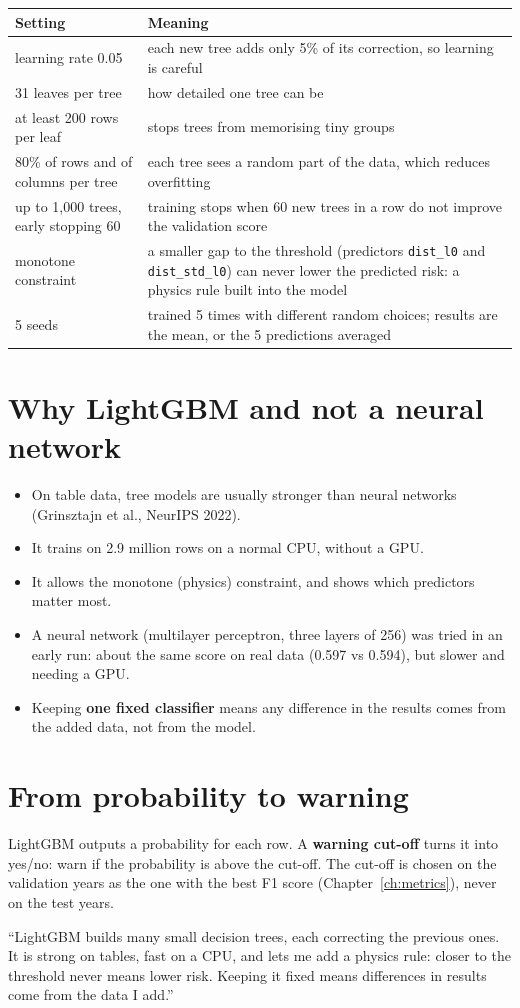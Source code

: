 \begin{center}
\footnotesize
\begin{tabular}{p{4.5cm}p{9.2cm}}
\toprule
\textbf{Setting} & \textbf{Meaning}\\
\midrule
learning rate 0.05 & each new tree adds only 5\% of its correction, so learning is careful\\
31 leaves per tree & how detailed one tree can be\\
at least 200 rows per leaf & stops trees from memorising tiny groups\\
80\% of rows and of columns per tree & each tree sees a random part of the data, which reduces overfitting\\
up to 1{,}000 trees, early stopping 60 & training stops when 60 new trees in a row do not improve the validation score\\
monotone constraint & a smaller gap to the threshold (predictors \texttt{dist\_l0} and \texttt{dist\_std\_l0}) can never lower the
  predicted risk: a physics rule built into the model\\
5 seeds & trained 5 times with different random choices; results are the mean, or the 5 predictions averaged\\
\bottomrule
\end{tabular}
\end{center}

\section{Why LightGBM and not a neural network}
\begin{itemize}
  \item On table data, tree models are usually stronger than neural networks (Grinsztajn et al., NeurIPS 2022).
  \item It trains on 2.9 million rows on a normal CPU, without a GPU.
  \item It allows the monotone (physics) constraint, and shows which predictors matter most.
  \item A neural network (multilayer perceptron, three layers of 256) was tried in an early run: about the same score
        on real data (0.597 vs 0.594), but slower and needing a GPU.
  \item Keeping \textbf{one fixed classifier} means any difference in the results comes from the added data, not from
        the model.
\end{itemize}

\section{From probability to warning}
LightGBM outputs a probability for each row. A \textbf{warning cut-off} turns it into yes/no: warn if the probability
is above the cut-off. The cut-off is chosen on the validation years as the one with the best F1 score
(Chapter~\ref{ch:metrics}), never on the test years.

\begin{sayit}
``LightGBM builds many small decision trees, each correcting the previous ones. It is strong on tables, fast on a CPU,
and lets me add a physics rule: closer to the threshold never means lower risk. Keeping it fixed means differences in
results come from the data I add.''
\end{sayit}
